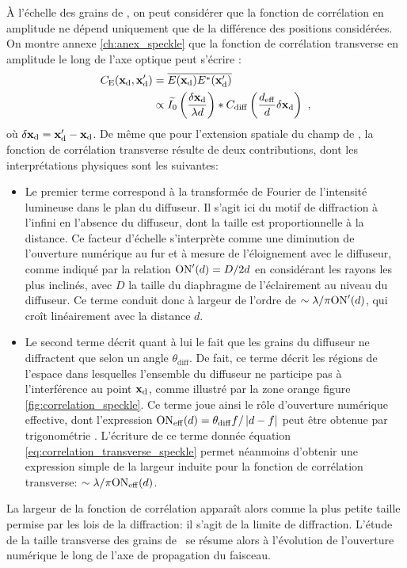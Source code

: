À l'échelle des grains de \speckle , on peut considérer que la fonction de corrélation en amplitude ne dépend uniquement que de la différence des positions considérées. On montre annexe \ref{ch:anex_speckle} que la fonction de corrélation transverse en amplitude le long de l'axe optique peut s'écrire \citep{gatti2008three}:
\begin{align}
\nonumber C_{\mathrm{E}}(\mathbf{x}_{\mathrm{d}},\mathbf{x}_{\mathrm{d}}') &= \overline{E(\mathbf{x}_{\mathrm{d}}) E^*(\mathbf{x}_{\mathrm{d}}')} \\
& \propto \widetilde{I_0}\left( \frac{\delta\mathbf{x}_{\mathrm{d}}}{\lambda d}\right) \ast C_{\mathrm{diff}}\left( \frac{d_{\mathrm{eff}}}{d} \delta \mathbf{x}_{\mathrm{d}} \right) \text{ ,}
\label{eq:correlation_transverse_speckle}
\end{align}
où $\delta\mathbf{x}_{\mathrm{d}}=\mathbf{x}_{\mathrm{d}}'-\mathbf{x}_{\mathrm{d}}$. De même que pour l'extension spatiale du champ de \speckle , la fonction de corrélation transverse résulte de deux contributions, dont les interprétations physiques sont les suivantes:
\begin{itemize}
\item[\textendash] Le premier terme correspond à la transformée de Fourier de l'intensité lumineuse dans le plan du diffuseur. Il s'agit ici du motif de diffraction à l'infini en l'absence du diffuseur, dont la taille est proportionnelle à la distance. Ce facteur d'échelle s'interprète comme une diminution de l'ouverture numérique au fur et à mesure de l'éloignement avec le diffuseur, comme indiqué par la relation $\mathrm{ON}'(d)=D/2d$ en considérant les rayons les plus inclinés, avec $D$ la taille du diaphragme de l'éclairement au niveau du diffuseur. Ce terme conduit donc à largeur de l'ordre de $\sim\lambda / \pi \mathrm{ON}'(d)$, qui croît linéairement avec la distance $d$. 
\item[\textendash] Le second terme décrit quant à lui le fait que les grains du diffuseur ne diffractent que selon un angle $\theta_{\mathrm{diff}}$. De fait, ce terme décrit les régions de l'espace dans lesquelles l'ensemble du diffuseur ne participe pas à l'interférence au point $\mathbf{x}_{\mathrm{d}}$, comme illustré par la zone orange figure \ref{fig:correlation_speckle}. Ce terme joue ainsi le rôle d'ouverture numérique effective, dont l'expression $\mathrm{ON}_{\mathrm{eff}}(d)=\theta_{\mathrm{diff}} f/\left| d-f \right|$ peut être obtenue par trigonométrie \citep{richard2015propagation}. L'écriture de ce terme donnée équation \ref{eq:correlation_transverse_speckle} permet néanmoins d'obtenir une expression simple de la largeur induite pour la fonction de corrélation transverse: $\sim\lambda /\pi \mathrm{ON}_{\mathrm{eff}} (d)$.
\end{itemize}
La largeur de la fonction de corrélation apparaît alors comme la plus petite taille permise par les lois de la diffraction: il s'agit de la limite de diffraction. L'étude de la taille transverse des grains de \speckle\ se résume alors à l'évolution de l'ouverture numérique le long de l'axe de propagation du faisceau.

